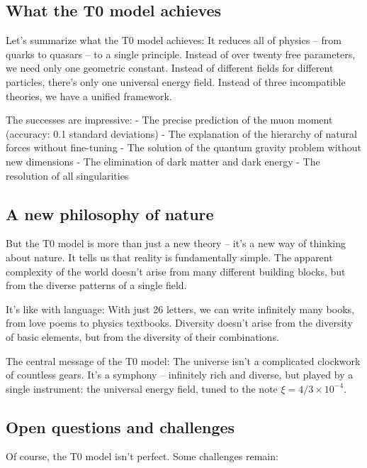\documentclass[12pt,a4paper]{article}
\newcommand{\xipar}{\ensuremath{\xi}}
\begin{document}
	\subsection{What the T0 model achieves}
	
	Let's summarize what the T0 model achieves: It reduces all of physics -- from quarks to quasars -- to a single principle. Instead of over twenty free parameters, we need only one geometric constant. Instead of different fields for different particles, there's only one universal energy field. Instead of three incompatible theories, we have a unified framework.
	
	The successes are impressive:
	- The precise prediction of the muon moment (accuracy: 0.1 standard deviations)
	- The explanation of the hierarchy of natural forces without fine-tuning
	- The solution of the quantum gravity problem without new dimensions
	- The elimination of dark matter and dark energy
	- The resolution of all singularities
	
	\subsection{A new philosophy of nature}
	
	But the T0 model is more than just a new theory -- it's a new way of thinking about nature. It tells us that reality is fundamentally simple. The apparent complexity of the world doesn't arise from many different building blocks, but from the diverse patterns of a single field.
	
	It's like with language: With just 26 letters, we can write infinitely many books, from love poems to physics textbooks. Diversity doesn't arise from the diversity of basic elements, but from the diversity of their combinations.
	
	\begin{important}
		The central message of the T0 model: 
		The universe isn't a complicated clockwork of countless gears. It's a symphony -- infinitely rich and diverse, but played by a single instrument: the universal energy field, tuned to the note $\xipar = 4/3 \times 10^{-4}$.
	\end{important}
	
	\subsection{Open questions and challenges}
	
	Of course, the T0 model isn't perfect. Some challenges remain:
	
\end{document}

